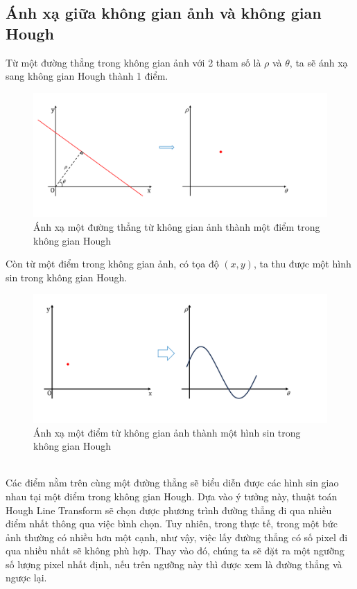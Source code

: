 \subsection{Ánh xạ giữa không gian ảnh và không gian Hough}
\tab Từ một đường thẳng trong không gian ảnh với 2 tham số là $\rho$ và $\theta$, ta sẽ ánh xạ sang không gian Hough thành 1 điểm.
\begin{figure}[htp]
\begin{center}
    \includegraphics[width=13cm]{img/2_Theory/hough_trans_3.jpg.png}
    \caption{\centering Ánh xạ một đường thẳng từ không gian ảnh thành một điểm trong không gian Hough}
\end{center}
\end{figure}
\newpage
\tab Còn từ một điểm trong không gian ảnh, có tọa độ $(x, y)$, ta thu được một hình sin trong không gian Hough.\\
\begin{figure}[!htp]
\begin{center}
    \includegraphics[width=12cm]{img/2_Theory/hough_trans_4.jpg.png}
    \caption{\centering Ánh xạ một điểm từ không gian ảnh thành một hình sin trong không gian Hough}
\end{center}
\end{figure}
\\
\tab Các điểm nằm trên cùng một đường thẳng sẽ biểu diễn được các hình sin giao nhau tại một điểm trong không gian Hough. Dựa vào ý tưởng này, thuật toán Hough Line Transform sẽ chọn được phương trình đường thẳng đi qua nhiều điểm nhất thông qua việc bình chọn. Tuy nhiên, trong thực tế, trong một bức ảnh thường có nhiều hơn một cạnh, như vậy, việc lấy đường thẳng có số pixel đi qua nhiều nhất sẽ không phù hợp. Thay vào đó, chúng ta sẽ đặt ra một ngưỡng số lượng pixel nhất định, nếu trên ngưỡng này thì được xem là đường thẳng và ngược lại.
